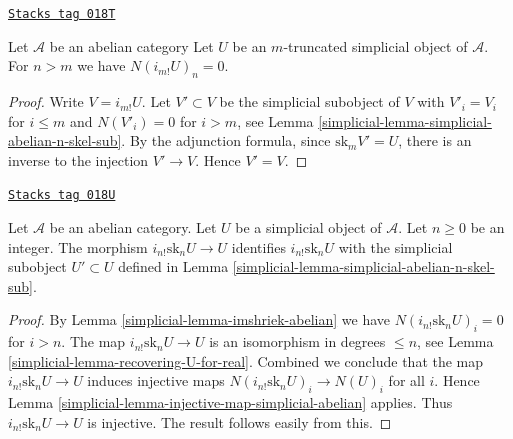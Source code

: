 \begin{lemma}
\label{simplicial-lemma-imshriek-abelian}
\href{https://stacks.math.columbia.edu/tag/018T}{\texttt{Stacks tag 018T}}

Let $\mathcal{A}$ be an abelian category
Let $U$ be an $m$-truncated simplicial object of
$\mathcal{A}$. For $n > m$ we have $N(i_{m!}U)_n = 0$.
\end{lemma}

\begin{proof}

Write $V = i_{m!}U$. Let $V' \subset V$ be the
simplicial subobject of $V$ with $V'_i = V_i$ for $i \leq m$
and $N(V'_i) = 0$ for $i > m$,
see Lemma \ref{simplicial-lemma-simplicial-abelian-n-skel-sub}.
By the adjunction formula,
since $\text{sk}_m V' = U$, there is an inverse to the
injection $V' \to V$. Hence $V' = V$.
\end{proof}

\begin{lemma}
\label{simplicial-lemma-n-skeleton-abelian}
\href{https://stacks.math.columbia.edu/tag/018U}{\texttt{Stacks tag 018U}}

Let $\mathcal{A}$ be an abelian category.
Let $U$ be a simplicial object of $\mathcal{A}$.
Let $n \geq 0$ be an integer.
The morphism $i_{n!} \text{sk}_n U \to U$ identifies
$i_{n!} \text{sk}_n U$ with the simplicial subobject
$U' \subset U$ defined in Lemma \ref{simplicial-lemma-simplicial-abelian-n-skel-sub}.
\end{lemma}

\begin{proof}

By Lemma \ref{simplicial-lemma-imshriek-abelian}
we have $N(i_{n!} \text{sk}_n U)_i = 0$
for $i > n$. The map
$i_{n!} \text{sk}_n U \to U$ is an isomorphism
in degrees $\leq n$, see Lemma \ref{simplicial-lemma-recovering-U-for-real}.
Combined we conclude that the map $i_{n!} \text{sk}_n U \to U$
induces injective maps $N(i_{n!} \text{sk}_n U)_i \to N(U)_i$
for all $i$. Hence Lemma \ref{simplicial-lemma-injective-map-simplicial-abelian}
applies. Thus $i_{n!} \text{sk}_n U \to U$
is injective. The result follows easily from this.
\end{proof}

